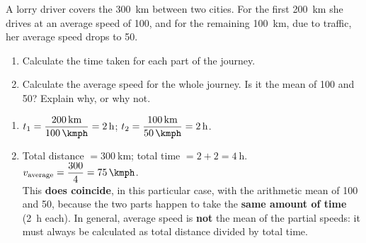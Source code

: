 \begin{exercise}
    A lorry driver covers the \qty{300}{\km} between two cities. For the first \qty{200}{\km} she drives at an average speed of \qty{100}{\kmph}, and for the remaining \qty{100}{\km}, due to traffic, her average speed drops to \qty{50}{\kmph}.
    \begin{enumerate}[label=\letraminuscula]
        \item Calculate the time taken for each part of the journey.
        \item Calculate the average speed for the whole journey. Is it the mean of \qty{100}{\kmph} and \qty{50}{\kmph}? Explain why, or why not.
    \end{enumerate}
    \begin{solu}
        \begin{enumerate}[label=\alph*)]
            \item \(t_1 = \dfrac{\qty{200}{\km}}{\qty{100}{\kmph}} = \qty{2}{\hour}\); \quad \(t_2 = \dfrac{\qty{100}{\km}}{\qty{50}{\kmph}} = \qty{2}{\hour}\).
            \item Total distance \(= \qty{300}{\km}\); total time \(= 2 + 2 = \qty{4}{\hour}\). \\
            \(v_{\text{average}} = \dfrac{300}{4} = \qty{75}{\kmph}\). \\
            This \textbf{does coincide}, in this particular case, with the arithmetic mean of \qty{100}{\kmph} and \qty{50}{\kmph}, because the two parts happen to take the \textbf{same amount of time} (\qty{2}{\hour} each). In general, average speed is \textbf{not} the mean of the partial speeds: it must always be calculated as total distance divided by total time.
        \end{enumerate}
    \end{solu}
\end{exercise}

